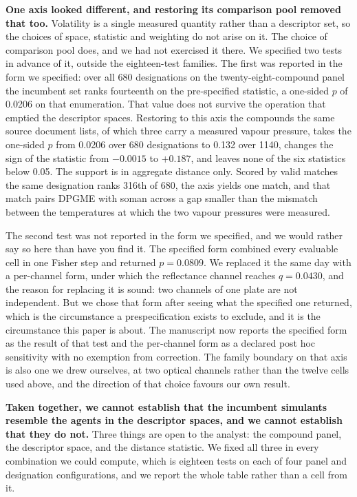 \documentclass[11pt,a4paper]{article}
\begin{document}
\textbf{One axis looked different, and restoring its comparison pool removed
that too.} Volatility is a single measured quantity rather than a descriptor
set, so the choices of space, statistic and weighting do not arise on it. The
choice of comparison pool does, and we had not exercised it there. We specified
two tests in advance of it, outside the eighteen-test families. The first was reported in the form we
specified: over all 680 designations on the twenty-eight-compound panel the
incumbent set ranks fourteenth on the pre-specified statistic, a one-sided $p$
of 0.0206 on that enumeration. That value does not survive the operation that emptied the descriptor spaces.
Restoring to this axis the compounds the same source document lists, of which
three carry a measured vapour pressure, takes the one-sided $p$ from 0.0206
over 680 designations to 0.132 over 1140, changes the sign of the statistic
from $-0.0015$ to $+0.187$, and leaves none of the six statistics below 0.05.
The support is in aggregate distance only. Scored by valid
matches the same designation ranks 316th of 680, the axis yields one match, and
that match pairs DPGME with soman across a gap smaller than the mismatch between
the temperatures at which the two vapour pressures were measured.

The second test was not reported in the form we specified, and we would rather
say so here than have you find it. The specified form combined every evaluable
cell in one Fisher step and returned $p = 0.0809$. We replaced it the same day
with a per-channel form, under which the reflectance channel reaches
$q = 0.0430$, and the reason for replacing it is sound: two channels of one
plate are not independent. But we chose that form after seeing what the
specified one returned, which is the circumstance a prespecification exists to
exclude, and it is the circumstance this paper is about. The manuscript now
reports the specified form as the result of that test and the per-channel form
as a declared post hoc sensitivity with no exemption from correction. The
family boundary on that axis is also one we drew ourselves, at two optical
channels rather than the twelve cells used above, and the direction of that
choice favours our own result.

\textbf{Taken together, we cannot establish that the incumbent simulants
resemble the agents in the descriptor spaces, and we cannot establish that they
do not.} Three things are
open to the analyst: the compound panel, the descriptor space, and the distance
statistic. We fixed all three in every combination we could compute, which is
eighteen tests on each of four panel and designation configurations, and we
report the whole table rather than a cell from it.
\end{document}
